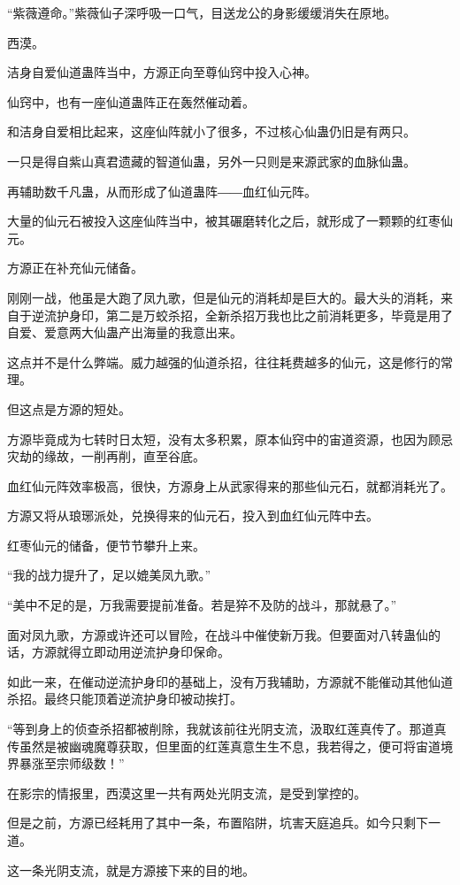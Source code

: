 \begin{this_body}
“紫薇遵命。”紫薇仙子深呼吸一口气，目送龙公的身影缓缓消失在原地。

西漠。

洁身自爱仙道蛊阵当中，方源正向至尊仙窍中投入心神。

仙窍中，也有一座仙道蛊阵正在轰然催动着。

和洁身自爱相比起来，这座仙阵就小了很多，不过核心仙蛊仍旧是有两只。

一只是得自紫山真君遗藏的智道仙蛊，另外一只则是来源武家的血脉仙蛊。

再辅助数千凡蛊，从而形成了仙道蛊阵――血红仙元阵。

大量的仙元石被投入这座仙阵当中，被其碾磨转化之后，就形成了一颗颗的红枣仙元。

方源正在补充仙元储备。

刚刚一战，他虽是大跑了凤九歌，但是仙元的消耗却是巨大的。最大头的消耗，来自于逆流护身印，第二是万蛟杀招，全新杀招万我也比之前消耗更多，毕竟是用了自爱、爱意两大仙蛊产出海量的我意出来。

这点并不是什么弊端。威力越强的仙道杀招，往往耗费越多的仙元，这是修行的常理。

但这点是方源的短处。

方源毕竟成为七转时日太短，没有太多积累，原本仙窍中的宙道资源，也因为顾忌灾劫的缘故，一削再削，直至谷底。

血红仙元阵效率极高，很快，方源身上从武家得来的那些仙元石，就都消耗光了。

方源又将从琅琊派处，兑换得来的仙元石，投入到血红仙元阵中去。

红枣仙元的储备，便节节攀升上来。

“我的战力提升了，足以媲美凤九歌。”

“美中不足的是，万我需要提前准备。若是猝不及防的战斗，那就悬了。”

面对凤九歌，方源或许还可以冒险，在战斗中催使新万我。但要面对八转蛊仙的话，方源就得立即动用逆流护身印保命。

如此一来，在催动逆流护身印的基础上，没有万我辅助，方源就不能催动其他仙道杀招。最终只能顶着逆流护身印被动挨打。

“等到身上的侦查杀招都被削除，我就该前往光阴支流，汲取红莲真传了。那道真传虽然是被幽魂魔尊获取，但里面的红莲真意生生不息，我若得之，便可将宙道境界暴涨至宗师级数！”

在影宗的情报里，西漠这里一共有两处光阴支流，是受到掌控的。

但是之前，方源已经耗用了其中一条，布置陷阱，坑害天庭追兵。如今只剩下一道。

这一条光阴支流，就是方源接下来的目的地。


\end{this_body}
